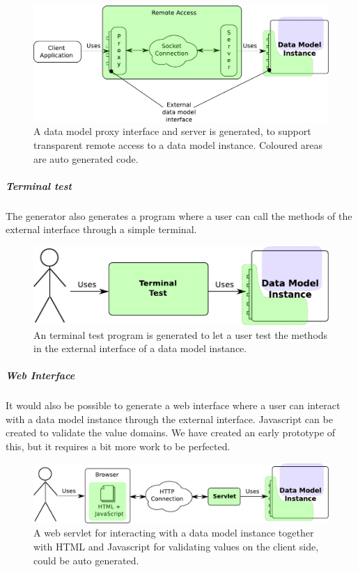 \begin{figure}[h!]
\centering
\includegraphics[scale=0.5]{img/remoteAccess.pdf}
\caption{A data model proxy interface and server is generated, to support transparent remote access to a data model instance. Coloured areas are auto generated code.}
\label{fig:remoteAccess}
\end{figure}


\subparagraph{Terminal test}

The generator also generates a program where a user can call the methods
of the external interface through a simple terminal.

\begin{figure}[h!]
\centering
\includegraphics[scale=0.5]{img/terminalTest.pdf}
\caption{An terminal test program is generated to let a user test the methods in the external interface of a data model instance.}
\label{fig:terminalTest}
\end{figure}


\subparagraph{Web Interface}

It would also be possible to generate a web interface where a user
can interact with a data model instance through the external interface.
Javascript can be created to validate the value domains. We have created
an early prototype of this, but it requires a bit more work to be
perfected.

\begin{figure}[h!]
\centering
\includegraphics[scale=0.5]{img/web.pdf}
\caption{A web servlet for interacting with a data model instance together with HTML and Javascript for validating values on the client side, could be auto generated.}
\label{fig:web}
\end{figure}


